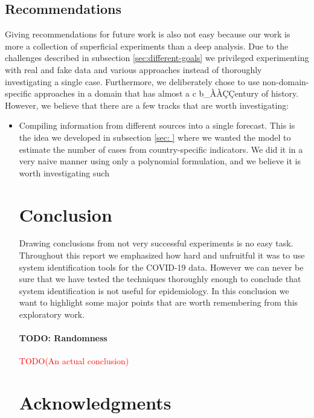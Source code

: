 \documentclass[12pt, letterpaper]{article}
\newcommand{\com}[1]{{\small {\fontfamily{ptm} \selectfont \textcolor{red}{#1}}}}
\begin{document}
\subsection{Recommendations}

Giving recommendations for future work is also not easy because our work is more a collection of superficial experiments than a deep analysis. 
Due to the challenges described in subsection \ref{sec:different-goals} we privileged experimenting with real and fake data and various approaches instead of thoroughly investigating a single case. 
Furthermore, we deliberately chose to use non-domain-specific approaches in a domain that has almost a c  b_ÀÀÇÇentury of history.
However, we believe that there are a few tracks that are worth investigating:

\begin{itemize}
	\item Compiling information from different sources into a single forecast. This is the idea we developed in subsection \ref{sec:
		} where we wanted the model to estimate the number of cases from country-specific indicators. We did it in a very naive manner using only a polynomial formulation, and we believe it is worth investigating such 


\section{Conclusion}\label{sec:conclusion}

Drawing conclusions from not very successful experiments is no easy task.
Throughout this report we emphasized how hard and unfruitful it was to use system identification tools for the COVID-19 data.
However we can never be sure that we have tested the techniques thoroughly enough to conclude that system identification is not useful for epidemiology.
In this conclusion we want to highlight some major points that are worth remembering from this exploratory work.

\paragraph{TODO: Randomness}

\com{TODO(An actual conclusion)}


\section*{Acknowledgments}
\label{sec:acknowledgments}


\end{itemize}
\end{document}
